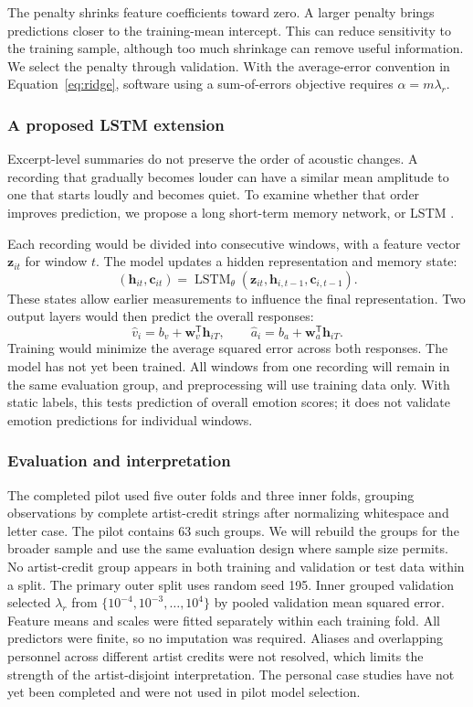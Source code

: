 The penalty shrinks feature coefficients toward zero. A larger penalty brings predictions closer to the training-mean intercept. This can reduce sensitivity to the training sample, although too much shrinkage can remove useful information. We select the penalty through validation. With the average-error convention in Equation~\eqref{eq:ridge}, software using a sum-of-errors objective requires $\alpha=m\lambda_r$.

\subsubsection{A proposed LSTM extension}

Excerpt-level summaries do not preserve the order of acoustic changes. A recording that gradually becomes louder can have a similar mean amplitude to one that starts loudly and becomes quiet. To examine whether that order improves prediction, we propose a long short-term memory network, or LSTM \cite{hochreiter1997lstm}.

Each recording would be divided into consecutive windows, with a feature vector $\bm z_{it}$ for window $t$. The model updates a hidden representation and memory state:
\[
(\bm h_{it},\bm c_{it})
=
\operatorname{LSTM}_{\theta}
(\bm z_{it},\bm h_{i,t-1},\bm c_{i,t-1}).
\]
These states allow earlier measurements to influence the final representation. Two output layers would then predict the overall responses:
\[
\widehat v_i=b_v+\bm w_v^{\mathsf T}\bm h_{iT},
\qquad
\widehat a_i=b_a+\bm w_a^{\mathsf T}\bm h_{iT}.
\]
Training would minimize the average squared error across both responses. The model has not yet been trained. All windows from one recording will remain in the same evaluation group, and preprocessing will use training data only. With static labels, this tests prediction of overall emotion scores; it does not validate emotion predictions for individual windows.

\subsubsection{Evaluation and interpretation}
The completed pilot used five outer folds and three inner folds, grouping observations by complete artist-credit strings after normalizing whitespace and letter case. The pilot contains 63 such groups. We will rebuild the groups for the broader sample and use the same evaluation design where sample size permits. No artist-credit group appears in both training and validation or test data within a split. The primary outer split uses random seed 195. Inner grouped validation selected $\lambda_r$ from $\{10^{-4},10^{-3},\ldots,10^4\}$ by pooled validation mean squared error. Feature means and scales were fitted separately within each training fold. All predictors were finite, so no imputation was required. Aliases and overlapping personnel across different artist credits were not resolved, which limits the strength of the artist-disjoint interpretation. The personal case studies have not yet been completed and were not used in pilot model selection.

